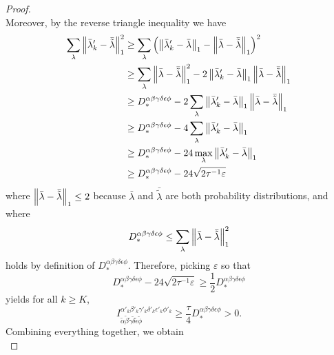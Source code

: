 \documentclass[notitlepage, 10pt]{article}
\begin{document}
\begin{proof}
\begin{equation}
    \end{equation}
    Moreover, by the reverse triangle inequality we have
    \begin{align}
        \sum_{\lambda} \left\lVert\bar \lambda'_k - \bar {\tilde \lambda}\right\rVert_{1}^2
        &\geq
        \sum_{\lambda}\left(\left\lVert\bar \lambda'_k - \bar \lambda\right\rVert_{1}
        -\left\lVert\bar \lambda - \bar {\tilde \lambda}\right\rVert_{1}\right)^2 \\
        &\geq
        \sum_{\lambda}\left\lVert\bar \lambda - \bar {\tilde \lambda}\right\rVert_{1}^2 -2\left\lVert\bar \lambda'_k - \bar \lambda\right\rVert_{1}\left\lVert\bar \lambda - \bar {\tilde \lambda}\right\rVert_{1}\\
        &\geq D_{*}^{\alpha\beta\gamma\delta\epsilon\phi}
         -2\sum_{\lambda}\left\lVert\bar \lambda'_k - \bar \lambda\right\rVert_{1}\left\lVert\bar \lambda - \bar {\tilde \lambda}\right\rVert_{1}\\
        &\geq D_{*}^{\alpha\beta\gamma\delta\epsilon\phi}
         -4\sum_{\lambda}\left\lVert\bar \lambda'_k - \bar \lambda\right\rVert_{1}\\
        &\geq D_{*}^{\alpha\beta\gamma\delta\epsilon\phi}
         -24\max_{\lambda}\left\lVert\bar \lambda'_k - \bar \lambda\right\rVert_{1}\\
        &\geq D_{*}^{\alpha\beta\gamma\delta\epsilon\phi}
        -24\sqrt{2 \tau^{-1} \varepsilon}
    \end{align}
    where $\left\lVert\bar \lambda - \bar {\tilde \lambda}\right\rVert_{1} \leq 2$ because $\bar \lambda$ and $\bar {\tilde \lambda}$ are both probability distributions, and where
    \begin{equation}
        D_{*}^{\alpha\beta\gamma\delta\epsilon\phi} \leq \sum_{\lambda}\left\lVert\bar \lambda - \bar {\tilde \lambda}\right\rVert_{1}^2
    \end{equation}
    holds by definition of $D_{*}^{\alpha\beta\gamma\delta\epsilon\phi}$.
    Therefore, picking $\varepsilon$ so that 
    \begin{equation}
        D_{*}^{\alpha\beta\gamma\delta\epsilon\phi}-24\sqrt{2 \tau^{-1} \varepsilon} \geq \frac{1}{2}D_{*}^{\alpha\beta\gamma\delta\epsilon\phi}
    \end{equation}
    yields for all $k \geq K$,
    \begin{equation}
        I^{\alpha'_k\beta'_k\gamma'_k\delta'_k\epsilon'_k\phi'_k}_{\tilde \alpha \tilde \beta\tilde \gamma\tilde \delta\tilde \epsilon\tilde \phi} \geq \frac{\tau}{4}D_{*}^{\alpha\beta\gamma\delta\epsilon\phi} > 0.
    \end{equation}
    Combining everything together, we obtain
    \begin{equation}

\end{equation}
\end{proof}
\end{document}
